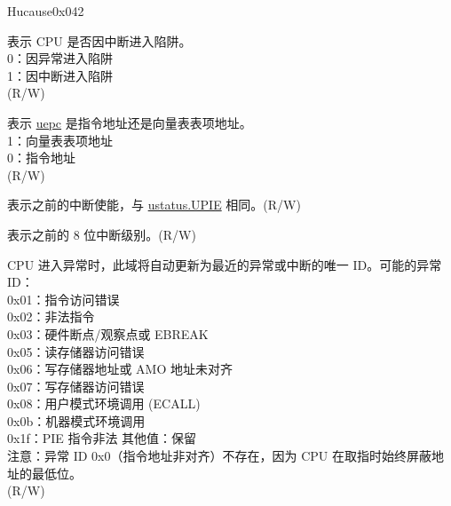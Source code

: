 \begin{register}{H}{ucause}{0x042}\label{regdesc:UCAUSE}
%
%
%
%
%
%
%
%
\regnewline%
\begin{regdesc}\begin{reglist}
\label{fielddesc:UCAUSEINT} \item [INT] 表示 CPU 是否因中断进入陷阱。\\
0：因异常进入陷阱\\
1：因中断进入陷阱\\
(R/W)
\label{fielddesc:UCAUSE_UINHV}\item [UINHV] 表示 \hyperref[fielddesc:UEPC]{uepc} 是指令地址还是向量表表项地址。\\
1：向量表表项地址\\
0：指令地址\\
(R/W)
\label{fielddesc:UCAUSE_UPIE}\item [UPIE] 表示之前的中断使能，与 \hyperref[fielddesc:USTATUSUPIE]{ustatus.UPIE} 相同。(R/W)
\label{fielddesc:UCAUSE_UPIL}\item [UPIL] 表示之前的 8 位中断级别。(R/W)
\label{fielddesc:UCAUSECODE}\item [CODE] CPU 进入异常时，此域将自动更新为最近的异常或中断的唯一 ID。可能的异常 ID：\\
0x01：指令访问错误\\
0x02：非法指令\\
0x03：硬件断点/观察点或 EBREAK\\
0x05：读存储器访问错误\\
0x06：写存储器地址或 AMO 地址未对齐\\
0x07：写存储器访问错误\\
0x08：用户模式环境调用 (ECALL)\\
0x0b：机器模式环境调用\\
0x1f：PIE 指令非法
其他值：保留\\
注意：异常 ID 0x0（指令地址非对齐）不存在，因为 CPU 在取指时始终屏蔽地址的最低位。\\
(R/W)
\end{reglist}\end{regdesc}
\end{register}

